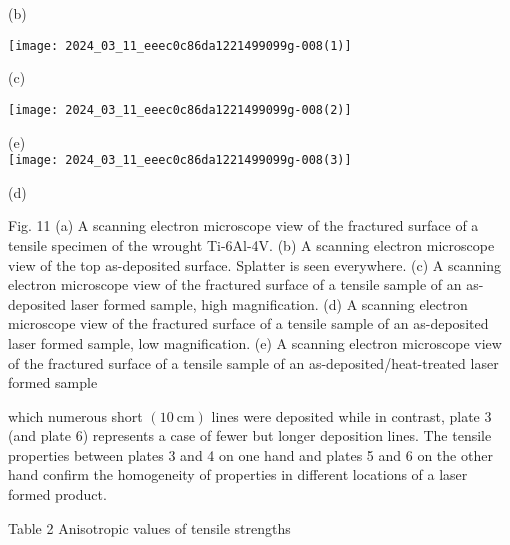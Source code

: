 \documentclass[10pt]{article}
\begin{document}
(b)

\begin{center}
\texttt{[image: 2024\_03\_11\_eeec0c86da1221499099g-008(1)]}
\end{center}

(c)

\begin{center}
\texttt{[image: 2024\_03\_11\_eeec0c86da1221499099g-008(2)]}
\end{center}

(e)\\
\texttt{[image: 2024\_03\_11\_eeec0c86da1221499099g-008(3)]}

(d)

Fig. 11 (a) A scanning electron microscope view of the fractured surface of a tensile specimen of the wrought Ti-6Al-4V. (b) A scanning electron microscope view of the top as-deposited surface. Splatter is seen everywhere. (c) A scanning electron microscope view of the fractured surface of a tensile sample of an as-deposited laser formed sample, high magnification. (d) A scanning electron microscope view of the fractured surface of a tensile sample of an as-deposited laser formed sample, low magnification. (e) A scanning electron microscope view of the fractured surface of a tensile sample of an as-deposited/heat-treated laser formed sample

which numerous short $(10 \mathrm{~cm})$ lines were deposited while in contrast, plate 3 (and plate 6) represents a case of fewer but longer deposition lines. The tensile properties between plates 3 and 4 on one hand and plates 5 and 6 on the other hand confirm the homogeneity of properties in different locations of a laser formed product.

Table 2 Anisotropic values of tensile strengths
\end{document}
